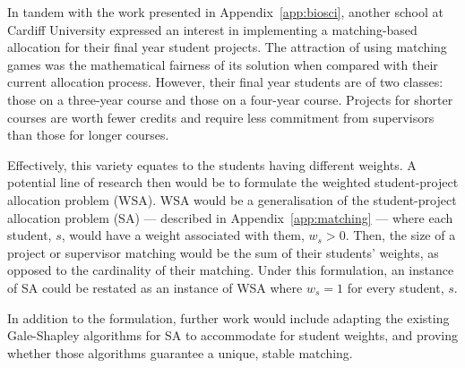 In tandem with the work presented in Appendix~\ref{app:biosci}, another school
at Cardiff University expressed an interest in implementing a matching-based
allocation for their final year student projects. The attraction of using
matching games was the mathematical fairness of its solution when compared with
their current allocation process. However, their final year students are of two
classes: those on a three-year course and those on a four-year course. Projects
for shorter courses are worth fewer credits and require less commitment from
supervisors than those for longer courses.

Effectively, this variety equates to the students having different weights. A
potential line of research then would be to formulate the weighted
student-project allocation problem (WSA). WSA would be a generalisation of the
student-project allocation problem (SA) --- described in
Appendix~\ref{app:matching} --- where each student, \(s\), would have a weight
associated with them, \(w_s > 0\). Then, the size of a project or supervisor
matching would be the sum of their students' weights, as opposed to the
cardinality of their matching. Under this formulation, an instance of SA could
be restated as an instance of WSA where \(w_s = 1\) for every student, \(s\).

In addition to the formulation, further work would include adapting the existing
Gale-Shapley algorithms for SA to accommodate for student weights, and proving
whether those algorithms guarantee a unique, stable matching.
